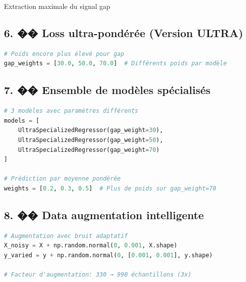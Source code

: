 \documentclass[a4paper,11pt]{article}
\begin{document}
\begin{tcolorbox}[styleImpact,title={Impact}]
Extraction maximale du signal gap
\end{tcolorbox}

\vspace{1em}

\subsection*{6. �� Loss ultra-pondérée (Version ULTRA)}

\begin{tcolorbox}[styleSolution,title={Amélioration}]
\begin{lstlisting}[language=Python]
# Poids encore plus élevé pour gap
gap_weights = [30.0, 50.0, 70.0]  # Différents poids par modèle
\end{lstlisting}
\end{tcolorbox}

\vspace{1em}

\subsection*{7. �� Ensemble de modèles spécialisés}

\begin{tcolorbox}[styleSolution,title={Amélioration}]
\begin{lstlisting}[language=Python]
# 3 modèles avec paramètres différents
models = [
    UltraSpecializedRegressor(gap_weight=30),
    UltraSpecializedRegressor(gap_weight=50),
    UltraSpecializedRegressor(gap_weight=70)
]

# Prédiction par moyenne pondérée
weights = [0.2, 0.3, 0.5]  # Plus de poids sur gap_weight=70
\end{lstlisting}
\end{tcolorbox}

\vspace{1em}

\subsection*{8. �� Data augmentation intelligente}

\begin{tcolorbox}[styleSolution,title={Amélioration}]
\begin{lstlisting}[language=Python]
# Augmentation avec bruit adaptatif
X_noisy = X + np.random.normal(0, 0.001, X.shape)
y_varied = y + np.random.normal(0, [0.001, 0.001], y.shape)

# Facteur d'augmentation: 330 → 990 échantillons (3x)
\end{lstlisting}
\end{tcolorbox}
\end{document}
